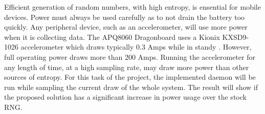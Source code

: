 
Efficient generation of random numbers, with high entropy, is ensential 
for mobile devices.  Power must always be used carefully as to not drain 
the battery too quickly.  Any peripheral device, such as an 
accelerometer, will use more power when it is collecting data.  The 
APQ8060 Dragonboard uses a Kionix KXSD9-1026 accelerometer which draws 
typically 0.3 \mu Amps while in standy \cite{Kionix}.  However, full 
operating power draws more than 200 \mu Amps.  Running the accelerometer 
for any length of time, at a high sampling rate, may draw more power 
than other sources of entropy.  For this task of the project, the 
implemented daemon will be run while sampling the current draw of the 
whole system.  The result will show if the proposed solution has a 
significant increase in power usage over the stock RNG.
